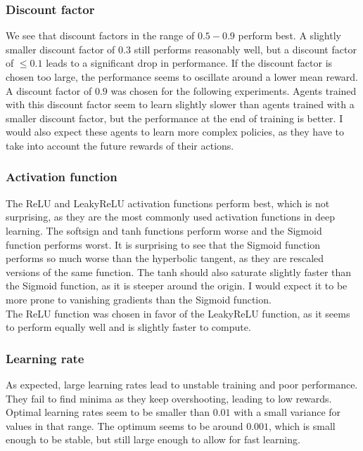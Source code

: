\subsubsection{Discount factor}
We see that discount factors in the range of $0.5-0.9$ perform best. A slightly smaller discount factor of $0.3$ still performs reasonably well, but a discount factor of $\le0.1$ leads to a significant drop in performance. If the discount factor is chosen too large, the performance seems to oscillate around a lower mean reward. A discount factor of $0.9$ was chosen for the following experiments. Agents trained with this discount factor seem to learn slightly slower than agents trained with a smaller discount factor, but the performance at the end of training is better. I would also expect these agents to learn more complex policies, as they have to take into account the future rewards of their actions. 

\subsubsection{Activation function}
The ReLU and LeakyReLU activation functions perform best, which is not surprising, as they are the most commonly used activation functions in deep learning. The softsign and tanh functions perform worse and the Sigmoid function performs worst. It is surprising to see that the Sigmoid function performs so much worse than the hyperbolic tangent, as they are rescaled versions of the same function. The tanh should also saturate slightly faster than the Sigmoid function, as it is steeper around the origin. I would expect it to be more prone to vanishing gradients than the Sigmoid function. \\
The ReLU function was chosen in favor of the LeakyReLU function, as it seems to perform equally well and is slightly faster to compute.

\subsubsection{Learning rate}
As expected, large learning rates lead to unstable training and poor performance. They fail to find minima as they keep overshooting, leading to low rewards. Optimal learning rates seem to be smaller than $0.01$ with a small variance for values in that range. The optimum seems to be around $0.001$, which is small enough to be stable, but still large enough to allow for fast learning. 

